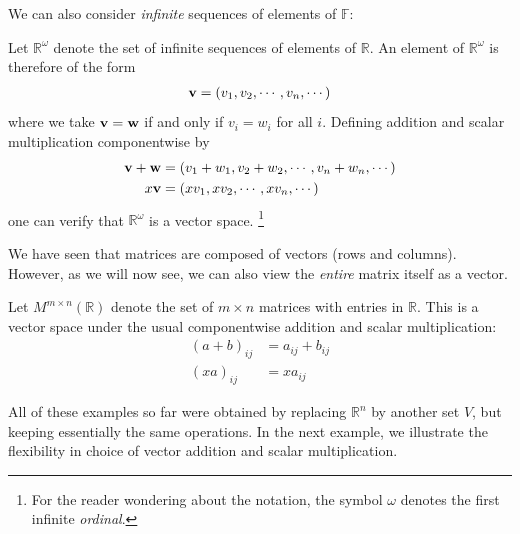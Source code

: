\documentclass[12pt,letterpaper,reqno]{article}
\numberwithin{equation}{section}
\begin{document}
We can also consider \emph{infinite} sequences of elements of $\mathbb{F}$:

\begin{example}
	Let $\mathbb{R}^\omega$ denote the set of infinite sequences of elements of $\mathbb{R}$. An element of $\mathbb{R}^\omega$ is therefore of the form 
	\begin{align*}{\bf v}=(v_1,v_2,\cdots, v_n,\cdots)
	\end{align*} 
	where we take ${\bf v}={\bf w}$ if and only if $v_i=w_i$ for all $i$. Defining addition and scalar multiplication componentwise by
	\begin{align*}
		{\bf v}+{\bf w} &=(v_1+w_1,v_2+w_2,\cdots, v_n+w_n,\cdots) \\
	x{\bf v} &=(xv_1, xv_2, \cdots, xv_n,\cdots)
	\end{align*}
	one can verify that $\mathbb{R}^\omega$ is a vector space. \footnote{For the reader wondering about the notation, the symbol $\omega$ denotes the first infinite \emph{ordinal}.}
\end{example}

We have seen that matrices are composed of vectors (rows and columns). However, as we will now see, we can also view the \emph{entire} matrix itself as a vector.

\begin{example}
	Let $M^{m \times n}(\mathbb{R})$ denote the set of $m \times n$ matrices with entries in $\mathbb{R}$. This is a vector space under the usual componentwise addition and scalar multiplication:
	\begin{align*}
		(a+b)_{ij}&=a_{ij}+b_{ij} \\
		(xa)_{ij}&=xa_{ij}
	\end{align*}
\end{example}

All of these examples so far were obtained by replacing $\mathbb{R}^n$ by another set $V$, but keeping essentially the same operations. In the next example, we illustrate the flexibility in choice of vector addition and scalar multiplication.
\end{document}
